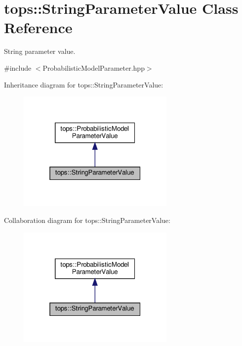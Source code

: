 \hypertarget{classtops_1_1StringParameterValue}{}\section{tops\+:\+:String\+Parameter\+Value Class Reference}
\label{classtops_1_1StringParameterValue}


String parameter value.  




{\ttfamily \#include $<$Probabilistic\+Model\+Parameter.\+hpp$>$}



Inheritance diagram for tops\+:\+:String\+Parameter\+Value\+:
\nopagebreak
\begin{figure}[H]
\begin{center}
\leavevmode
\includegraphics[width=217pt]{classtops_1_1StringParameterValue__inherit__graph}
\end{center}
\end{figure}


Collaboration diagram for tops\+:\+:String\+Parameter\+Value\+:
\nopagebreak
\begin{figure}[H]
\begin{center}
\leavevmode
\includegraphics[width=217pt]{classtops_1_1StringParameterValue__coll__graph}
\end{center}
\end{figure}
